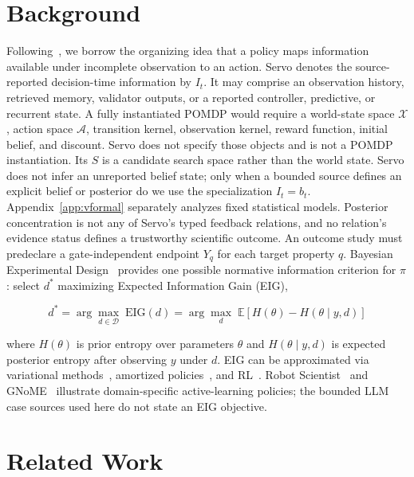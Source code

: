 \documentclass{article}
\begin{document}
\section{Background}
\label{sec:background}

Following~\citet{kaelbling1998pomdp}, we borrow the organizing idea that a policy maps information available under incomplete observation to an action. Servo denotes the source-reported decision-time information by $I_t$. It may comprise an observation history, retrieved memory, validator outputs, or a reported controller, predictive, or recurrent state. A fully instantiated POMDP would require a world-state space $\mathcal X$, action space $\mathcal A$, transition kernel, observation kernel, reward function, initial belief, and discount. Servo does not specify those objects and is not a POMDP instantiation. Its $S$ is a candidate search space rather than the world state. Servo does not infer an unreported belief state; only when a bounded source defines an explicit belief or posterior do we use the specialization $I_t=b_t$. Appendix~\ref{app:vformal} separately analyzes fixed statistical models. Posterior concentration is not any of Servo's typed feedback relations, and no relation's evidence status defines a trustworthy scientific outcome. An outcome study must predeclare a gate-independent endpoint $Y_q$ for each target property $q$. Bayesian Experimental Design~\citep{chaloner1995bayesian,rainforth2024modern} provides one possible normative information criterion for $\pi$: select $d^*$ maximizing Expected Information Gain (EIG),

\begin{equation}
  d^* = \arg\max_{d \in \mathcal{D}}\; \mathrm{EIG}(d) = \arg\max_{d}\; \mathbb{E}\left[H(\theta) - H(\theta \mid y, d)\right]
  \label{eq:eid}
\end{equation}

where $H(\theta)$ is prior entropy over parameters $\theta$ and $H(\theta \mid y, d)$ is expected posterior entropy after observing $y$ under $d$. EIG can be approximated via variational methods~\citep{foster2019variational}, amortized policies~\citep{foster2021dad}, and RL~\citep{blau2022rl}. Robot Scientist~\citep{king2004robot} and GNoME~\citep{merchant2023gnome} illustrate domain-specific active-learning policies; the bounded LLM case sources used here do not state an EIG objective.

\section{Related Work}
\label{sec:related}
\end{document}
